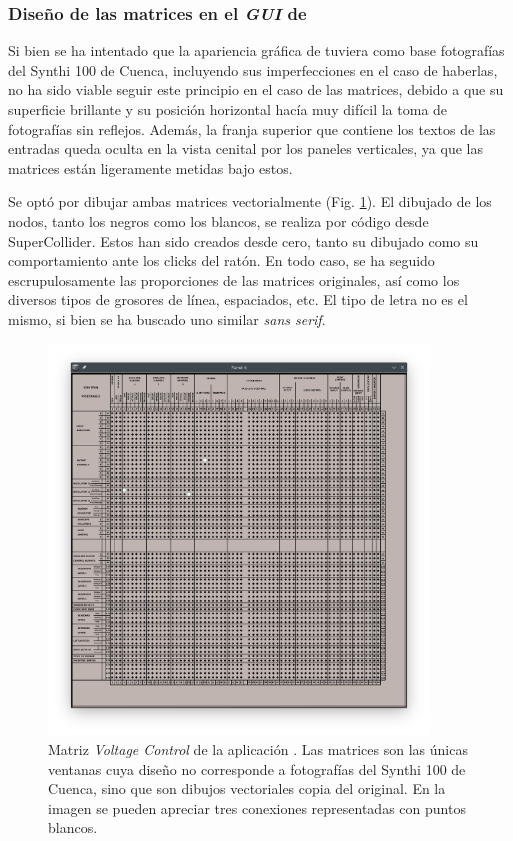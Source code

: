 \subsubsection[]{Diseño de las matrices en el \textit{GUI} de  \appName}
Si bien se ha intentado que la apariencia gráfica de \appName tuviera como base fotografías del Synthi 100 de Cuenca, incluyendo sus imperfecciones en el caso de haberlas, no ha sido viable seguir este principio en el caso de las matrices, debido a que su superficie brillante y su posición horizontal hacía muy difícil la toma de fotografías sin reflejos. Además, la franja superior que contiene los textos de las entradas queda oculta en la vista cenital por los paneles verticales, ya que las matrices están ligeramente metidas bajo estos.

Se optó por dibujar ambas matrices vectorialmente (Fig. \ref{fig:matriz_control_synthigme}). El dibujado de los nodos, tanto los negros como los blancos, se realiza por código desde SuperCollider. Estos han sido creados desde cero, tanto su dibujado como su comportamiento ante los clicks del ratón. En todo caso, se ha seguido escrupulosamente las proporciones de las matrices originales, así como los diversos tipos de grosores de línea, espaciados, etc.  El tipo de letra no es el mismo, si bien se ha buscado uno similar \textit{sans serif}.

\begin{figure}
	\centering
	\includegraphics[width=0.9\textwidth]{images/matriz_control_synthigme}
	\caption[Matriz \textit{Voltage Control} de la aplicación \appName]{Matriz \textit{Voltage Control} de la aplicación \appName. Las matrices son las únicas ventanas cuya diseño no corresponde a fotografías del Synthi 100 de Cuenca, sino que son dibujos vectoriales copia del original. En la imagen se pueden apreciar tres conexiones representadas con puntos blancos.}
	\label{fig:matriz_control_synthigme}
\end{figure}